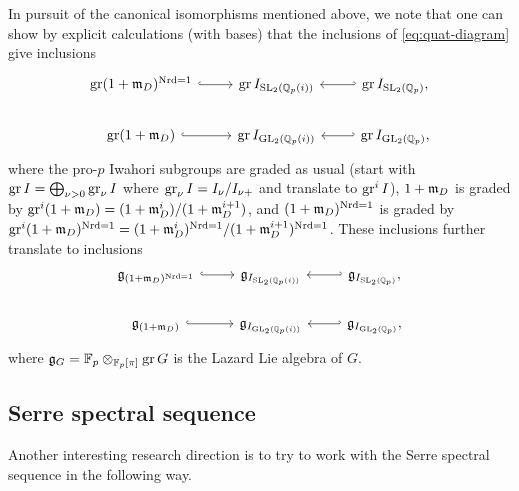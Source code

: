 In pursuit of the canonical isomorphisms mentioned above, we note that one can show by explicit calculations (with bases) that the inclusions of \eqref{eq:quat-diagram} give inclusions
\begin{equation*}
  \begin{tikzcd}
    \gr (1+\idm_{D})^{\Nrd = 1} \ar[r, hook] & \gr I_{\SL_{2}(\Q_{p}(i))} & \ar[l, hook'] \gr I_{\SL_{2}(\Q_{p})}, \\
    \gr (1+\idm_{D}) \ar[r, hook] & \gr I_{\GL_{2}(\Q_{p}(i))} & \ar[l, hook'] \gr I_{\GL_{2}(\Q_{p})},
  \end{tikzcd}
\end{equation*}
where the pro-$p$ Iwahori subgroups are graded as usual (start with $\operatorname{gr} I = \bigoplus_{\nu>0} \operatorname{gr}_{\nu} I$ where $\operatorname{gr}_{\nu} I = I_{\nu}/I_{\nu+}$ and translate to $\operatorname{gr}^{i} I$), $1+\mathfrak{m}_{D}$ is graded by $\operatorname{gr}^{i}(1+\mathfrak{m}_{D}) = (1+\mathfrak{m}_{D}^{i})/(1+\mathfrak{m}_{D}^{i+1})$, and $(1+\mathfrak{m}_{D})^{\operatorname{Nrd} = 1}$ is graded by $\operatorname{gr}^{i}(1+\mathfrak{m}_{D})^{\operatorname{Nrd} = 1} = (1+\mathfrak{m}_{D}^{i})^{\operatorname{Nrd} = 1}/(1+\mathfrak{m}_{D}^{i+1})^{\operatorname{Nrd} = 1}$. These inclusions further translate to inclusions
\begin{equation*}
  \begin{tikzcd}
    \lie{g}_{(1+\idm_{D})^{\Nrd = 1}} \ar[r, hook] & \lie{g}_{I_{\SL_{2}(\Q_{p}(i))}} & \ar[l, hook'] \lie{g}_{I_{\SL_{2}(\Q_{p})}}, \\
    \lie{g}_{(1+\idm_{D})} \ar[r, hook] & \lie{g}_{I_{\GL_{2}(\Q_{p}(i))}} & \ar[l, hook'] \lie{g}_{I_{\GL_{2}(\Q_{p})}},
  \end{tikzcd}
\end{equation*}
where $\mathfrak{g}_{G} = \mathbb{F}_{p} \otimes_{\mathbb{F}_{p}[\pi]} \operatorname{gr} G$ is the Lazard Lie algebra of $G$.



\subsection{Serre spectral sequence}%
\label{subsec:Serre-spec-seq}

Another interesting research direction is to try to work with the Serre spectral sequence in the following way.

